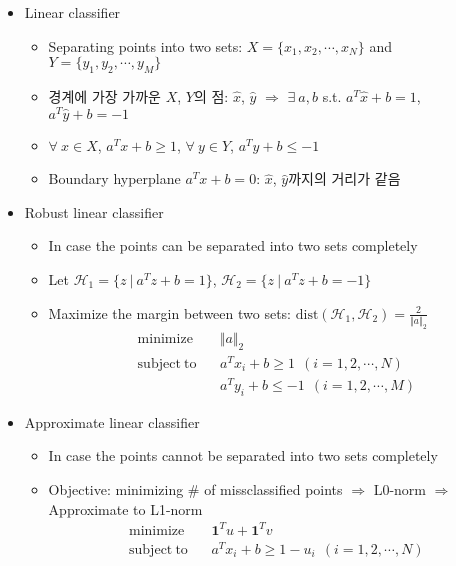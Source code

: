 \begin{itemize}
    \item Linear classifier
    \begin{itemize}
        \item Separating points into two sets: $X=\{x_1,x_2,\cdots,x_N\}$ and $Y=\{y_1,y_2,\cdots,y_M\}$
        \item 경계에 가장 가까운 $X$, $Y$의 점: $\hat{x}$, $\hat{y}$ $\Rightarrow$ $\exists~a,b$ s.t. $a^T\hat{x}+b=1$, $a^T\hat{y}+b=-1$
        \item $\forall~x\in X$, $a^Tx+b\geq1$, $\forall~y\in Y$, $a^Ty+b\leq-1$
        \item Boundary hyperplane $a^Tx+b=0$: $\hat{x}$, $\hat{y}$까지의 거리가 같음
    \end{itemize}
    \newpage
    \item Robust linear classifier
    \begin{itemize}
        \item In case the points can be separated into two sets completely
        \item Let $\mathcal{H}_1=\{z~|~a^Tz+b=1\}$, $\mathcal{H}_2=\{z~|~a^Tz+b=-1\}$
        \item Maximize the margin between two sets: $\mathrm{dist}(\mathcal{H}_1,\mathcal{H}_2)=\frac{2}{\Vert a\Vert_2}$
        \begin{equation}\begin{aligned}
            \mathrm{minimize}~~&~~\Vert a\Vert_2 \\
            \mathrm{subject~to}~~&~~a^Tx_i+b\geq1~~(i=1,2,\cdots,N) \\
                &~~a^Ty_i+b\leq-1~~(i=1,2,\cdots,M)
        \end{aligned}\end{equation}
    \end{itemize}
    \item Approximate linear classifier
    \begin{itemize}
        \item In case the points cannot be separated into two sets completely
        \item Objective: minimizing \# of missclassified points $\Rightarrow$ L0-norm $\Rightarrow$ Approximate to L1-norm
        \begin{equation}\begin{aligned}
            \mathrm{minimize}~~&~~\mathbf{1}^Tu+\mathbf{1}^Tv \\
            \mathrm{subject~to}~~&~~a^Tx_i+b\geq1-u_i~~(i=1,2,\cdots,N) \\

\end{aligned}
\end{equation}
\end{itemize}
\end{itemize}
